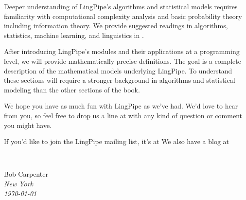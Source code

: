 Deeper understanding of LingPipe's algorithms and statistical models
requires familiarity with computational complexity analysis and basic
probability theory including information theory.  We provide suggested
readings in algorithms, statistics, machine learning, and linguistics
in .

After introducing LingPipe's modules and their applications at a
programming level, we will provide mathematically precise definitions.
The goal is a complete description of the mathematical models
underlying LingPipe.  To understand these sections will require a
stronger background in algorithms and statistical modeling than
the other sections of the book.

We hope you have as much fun with LingPipe as we've had.  We'd love to
hear from you, so feel free to drop us a line at
 with any kind of question or comment you
might have.

If you'd like to join the LingPipe mailing list, it's at
%
%
We also have a blog at
%



\newlength{\sigWidth}
\mbox{ }
\hfill
\parbox{\sigWidth}{
Bob Carpenter
\\[2pt]\small
\it New York
\\
\today}

